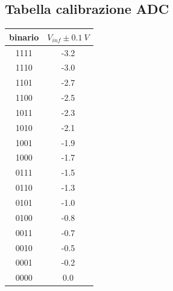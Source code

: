 \documentclass[journal]{IEEEtran}
\begin{document}
\begin{appendices}
\section{Tabella calibrazione ADC}

\begin{tabular}{cc}
binario & $V_{inf}  \pm 0.1 \ V$ \\ \hline
1111    & -3.2                  \\
1110    & -3.0                  \\
1101    & -2.7                  \\
1100    & -2.5                  \\
1011    & -2.3                  \\
1010    & -2.1                  \\
1001    & -1.9                  \\
1000    & -1.7                  \\
0111    & -1.5                  \\
0110    & -1.3                  \\
0101    & -1.0                  \\
0100    & -0.8                  \\
0011    & -0.7                  \\
0010    & -0.5                  \\
0001    & -0.2                  \\
0000    & 0.0
\vspace{5 mm}
\label{tab:calibrazione_adc}
\end{tabular}


\end{appendices}


\clearpage
\newpage

\tableofcontents %


\printbibliography %
\end{document}
